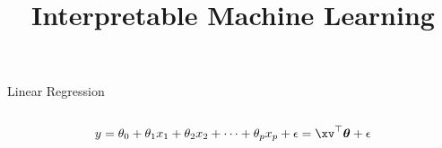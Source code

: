 \documentclass[11pt,compress,t,notes=noshow, aspectratio=169, xcolor=table]{beamer}
\title{Interpretable Machine Learning}
\date{}
\begin{document}
\newcommand{\titlefigure}{figure/lm_example}
\newcommand{\learninggoals}{
\item Interpretation of main effects in LM
\item Inclusion of high-order and interaction effects
\item Regularization via LASSO
}





\begin{frame}[c]{Linear Regression}

\begin{columns}[T, totalwidth = \linewidth]
\begin{column}{0.58\linewidth}
$$y = \theta_0 + \theta_1 x_1 + \theta_2 x_2 + \dots + \theta_p x_p + \epsilon = \xv^\top \boldsymbol{\theta} + \epsilon$$


\end{column}
\end{columns}
\end{frame}
\end{document}
